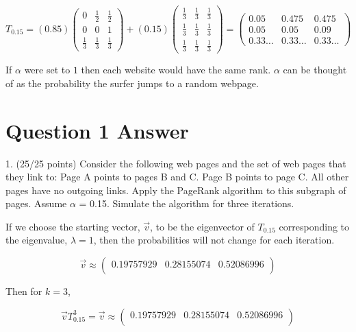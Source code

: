 \documentclass[12pt]{article}
\begin{document}
$$
T_{0.15} = 
\left( 0.85 \right)
\begin{pmatrix} 
  0 	& \frac{1}{2} 	& \frac{1}{2}  \\
  0 	& 0 			& 1 		 \\
  \frac{1}{3} 	& \frac{1}{3} 	& \frac{1}{3}
\end{pmatrix}
 + 
\left( 0.15 \right)
\begin{pmatrix} 
  \frac{1}{3} 	& \frac{1}{3} 	& \frac{1}{3} \\
  \frac{1}{3} 	& \frac{1}{3} 	& \frac{1}{3} \\
  \frac{1}{3} 	& \frac{1}{3} 	& \frac{1}{3}
\end{pmatrix}
=
\begin{pmatrix} 
  0.05 	& 0.475 	& 0.475 \\
  0.05 	& 0.05 	& 0.09 \\
  0.33 \dots 	&  0.33 \dots 	&  0.33 \dots
\end{pmatrix}
$$

If $\alpha$ were set to $1$ then each website would have the same rank. $\alpha$ can be thought of as the probability the surfer jumps to a random webpage. 

%
%

\section{Question 1 Answer}
1.	(25/25 points) Consider the following web pages and the set of web pages that they link to:
Page A points to pages B and C.
Page B points to page C.
All other pages have no outgoing links.
Apply the PageRank algorithm to this subgraph of pages. Assume $\alpha$ = 0.15. Simulate the algorithm for three iterations. 

If we choose the starting vector, $\vec{v}$, to be the eigenvector of $T_{0.15}$ corresponding to the eigenvalue, $\lambda = 1$, then the probabilities will not change for each iteration.

\begin{equation}
\nonumber \vec{v} \approx
\begin{pmatrix}
   0.19757929 &  0.28155074 & 0.52086996 \\
\end{pmatrix}
\end{equation}

Then for $k=3$,

$$
\vec{v} T_{0.15}^3 = \vec{v} \approx 
\begin{pmatrix}
   0.19757929 &  0.28155074 & 0.52086996 \\
\end{pmatrix}$$
\end{document}
